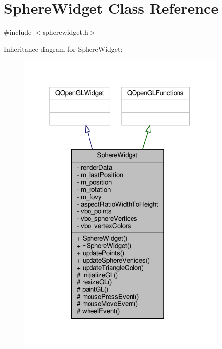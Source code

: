 \hypertarget{class_sphere_widget}{}\section{Sphere\+Widget Class Reference}
\label{class_sphere_widget}


{\ttfamily \#include $<$spherewidget.\+h$>$}



Inheritance diagram for Sphere\+Widget\+:\nopagebreak
\begin{figure}[H]
\begin{center}
\leavevmode
\includegraphics[width=292pt]{class_sphere_widget__inherit__graph}
\end{center}
\end{figure}


